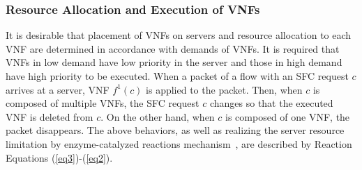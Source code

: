 \documentclass[technicalreport]{ieicej}
\begin{document}
	\subsubsection{Resource Allocation and Execution of VNFs}
	It is desirable that placement of VNFs on servers and resource allocation to each VNF are determined in accordance with demands of VNFs.
	It is required that VNFs in low demand have low priority in the server and those in high demand have high priority to be executed.
	When a packet of a flow with an SFC request $c$ arrives at a server, VNF $\mathit{f^1(c)}$ is applied to the packet.
	Then, when $c$ is composed of multiple VNFs, the SFC request $c$ changes so that the executed VNF is deleted from $c$.
	On the other hand, when $c$ is composed of one VNF, the packet disappears.
	The above behaviors, as well as realizing the server resource limitation by enzyme-catalyzed reactions mechanism~\cite{goldberg2004sciencedirect}, are described by Reaction Equations (\ref{eq3})-(\ref{eq2}).

\end{document}
